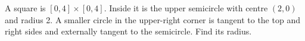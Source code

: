 A square is $[0,4]\times[0,4]$. Inside it is the upper semicircle with centre $(2,0)$ and radius 2. A smaller circle in the upper-right corner is tangent to the top and right sides and externally tangent to the semicircle. Find its radius.
